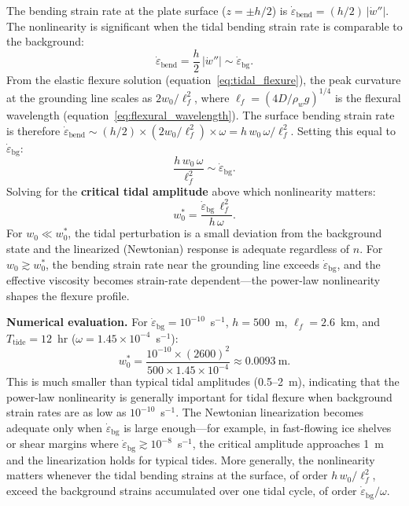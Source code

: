 \documentclass[11pt]{article}
\begin{document}
\medskip
\noindent The bending strain rate at the plate surface ($z = \pm h/2$) is $\dot{\varepsilon}_{\text{bend}} = (h/2)\,|\dot{w}''|$.  The nonlinearity is significant when the tidal bending strain rate is comparable to the background:
\begin{equation}
  \dot{\varepsilon}_{\text{bend}} = \frac{h}{2}\,|\dot{w}''| \sim \dot{\varepsilon}_{\text{bg}}.
\end{equation}
From the elastic flexure solution (equation~\eqref{eq:tidal_flexure}), the peak curvature at the grounding line scales as $2w_0/\ell_f^2$, where $\ell_f = (4D/\rho_w g)^{1/4}$ is the flexural wavelength (equation~\eqref{eq:flexural_wavelength}).  The surface bending strain rate is therefore $\dot{\varepsilon}_{\text{bend}} \sim (h/2) \times (2w_0/\ell_f^2) \times \omega = h\,w_0\,\omega / \ell_f^2$.  Setting this equal to $\dot{\varepsilon}_{\text{bg}}$:
\begin{equation}
  \frac{h\,w_0\,\omega}{\ell_f^2} \sim \dot{\varepsilon}_{\text{bg}}.
\end{equation}
Solving for the \textbf{critical tidal amplitude} above which nonlinearity matters:
\begin{equation}
  \boxed{w_0^* = \frac{\dot{\varepsilon}_{\text{bg}}\,\ell_f^2}{h\,\omega}.}
  \label{eq:critical_tidal_height}
\end{equation}
For $w_0 \ll w_0^*$, the tidal perturbation is a small deviation from the background state and the linearized (Newtonian) response is adequate regardless of $n$.  For $w_0 \gtrsim w_0^*$, the bending strain rate near the grounding line exceeds $\dot{\varepsilon}_{\text{bg}}$, and the effective viscosity becomes strain-rate dependent---the power-law nonlinearity shapes the flexure profile.

\medskip
\noindent\textbf{Numerical evaluation.}  For $\dot{\varepsilon}_{\text{bg}} = 10^{-10}$~s$^{-1}$, $h = 500$~m, $\ell_f = 2.6$~km, and $T_{\text{tide}} = 12$~hr ($\omega = 1.45 \times 10^{-4}$~s$^{-1}$):
\begin{equation}
  w_0^* = \frac{10^{-10} \times (2600)^2}{500 \times 1.45 \times 10^{-4}} \approx 0.0093~\text{m}.
\end{equation}
This is much smaller than typical tidal amplitudes (0.5--2~m), indicating that the power-law nonlinearity is generally important for tidal flexure when background strain rates are as low as $10^{-10}$~s$^{-1}$.  The Newtonian linearization becomes adequate only when $\dot{\varepsilon}_{\text{bg}}$ is large enough---for example, in fast-flowing ice shelves or shear margins where $\dot{\varepsilon}_{\text{bg}} \gtrsim 10^{-8}$~s$^{-1}$, the critical amplitude approaches 1~m and the linearization holds for typical tides.  More generally, the nonlinearity matters whenever the tidal bending strains at the surface, of order $h\,w_0 / \ell_f^2$, exceed the background strains accumulated over one tidal cycle, of order $\dot{\varepsilon}_{\text{bg}} / \omega$.
\end{document}
